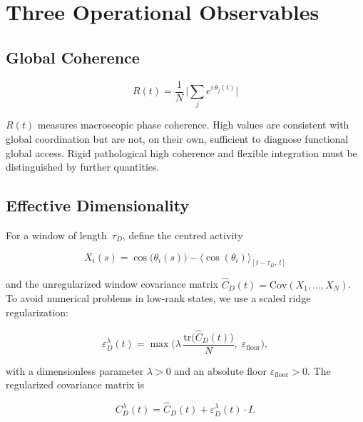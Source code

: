 ﻿\documentclass[11pt,a4paper]{article}
\theoremstyle{plain}
\theoremstyle{definition}
\theoremstyle{remark}
\begin{document}
\section{Three Operational Observables}
\label{sec:observablen}

\subsection{Global Coherence}

\begin{equation}
\label{eq:R}
R(t) = \frac{1}{N}\,\biggl|\sum_{j} e^{i\,\theta_j(t)}\biggr|
\end{equation}

$R(t)$ measures macroscopic phase coherence. High values are consistent with global coordination but are not, on their own, sufficient to diagnose functional global access. Rigid pathological high coherence and flexible integration must be distinguished by further quantities.

\subsection{Effective Dimensionality}

For a window of length~$\tau_D$, define the centred activity

\begin{equation}
X_i(s) = \cos\!\bigl(\theta_i(s)\bigr) - \bigl\langle\cos(\theta_i)\bigr\rangle_{[t-\tau_D,\,t]}
\end{equation}

and the unregularized window covariance matrix $\hat{C}_D(t) = \mathrm{Cov}(X_1,\ldots,X_N)$. To avoid numerical problems in low-rank states, we use a scaled ridge regularization:

\begin{equation}
\label{eq:ridge}
\varepsilon_D^{\lambda}(t) = \max\!\biggl(\lambda\,\frac{\mathrm{tr}\bigl(\hat{C}_D(t)\bigr)}{N},\;\varepsilon_{\mathrm{floor}}\biggr),
\end{equation}

with a dimensionless parameter $\lambda > 0$ and an absolute floor $\varepsilon_{\mathrm{floor}} > 0$. The regularized covariance matrix is

\begin{equation}
C_D^{\lambda}(t) = \hat{C}_D(t) + \varepsilon_D^{\lambda}(t)\cdot I.
\end{equation}
\end{document}
